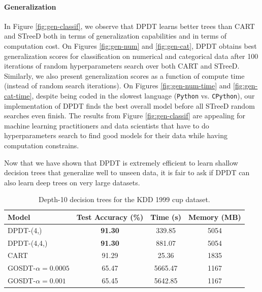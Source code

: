 \paragraph{Generalization} In Figure \ref{fig:gen-classif}, we observe that DPDT learns better trees than CART and STreeD both in terms of generalization capabilities and in terms of computation cost. On Figures \ref{fig:gen-num} and \ref{fig:gen-cat}, DPDT obtains best generalization scores for classification on numerical and categorical data after 100 iterations of random hyperparameters search over both CART and STreeD. Similarly, we also present generalization scores as a function of compute time (instead of random search iterations). On Figures \ref{fig:gen-num-time} and \ref{fig:gen-cat-time}, despite being coded in the slowest language (\texttt{Python} vs. \texttt{CPython}), our implementation of DPDT finds the best overall model before all STreeD random searches even finish.
The results from Figure \ref{fig:gen-classif} are appealing for machine learning practitioners and data scientists that have to do hyperparameters search to find good models for their data while having computation constrains.

Now that we have shown that DPDT is extremely efficient to learn shallow decision trees that generalize well to unseen data, it is fair to ask if DPDT can also learn deep trees on very large datasets.

\begin{table}
\centering
\caption{Depth-10 decision trees for the KDD 1999 cup dataset.}
\label{tab:model-comparison}
\small
\begin{tabular}{lccc}
\hline
\textbf{Model} & \textbf{Test Accuracy (\%)} & \textbf{Time (s)} & \textbf{Memory (MB)} \\
\hline
DPDT-(4,) & \textbf{91.30} & 339.85 & 5054 \\
DPDT-(4,4,) & \textbf{91.30} & 881.07 & 5054 \\
CART & 91.29 & 25.36 & 1835 \\
GOSDT-$\alpha=0.0005$& 65.47 & 5665.47 & 1167 \\
GOSDT-$\alpha=0.001$ & 65.45 & 5642.85 & 1167 \\
\hline
\end{tabular}
\end{table}

